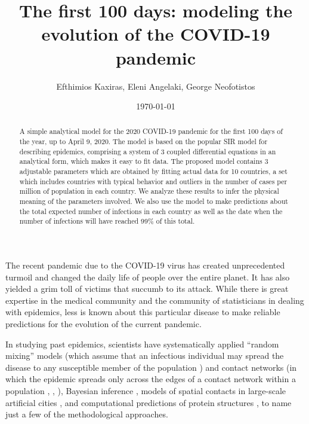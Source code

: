 \documentclass[aps,preprint]{revtex4}
\begin{document}
  

\title{The first 100 days:
modeling the evolution of the COVID-19 pandemic
}
\author{Efthimios Kaxiras, Eleni Angelaki, George Neofotistos 
}

\date{\today}


\begin{abstract}
A simple analytical model for the 2020 COVID-19 pandemic for the first 100 days of the year,
up to April 9, 2020.  The model is based on the popular SIR model for 
describing epidemics, comprising a system of 3 coupled differential equations in an analytical form, which makes it easy to fit data. 
The proposed model contains 3 adjustable parameters which are obtained by fitting actual data 
for 10 countries, a set which includes countries with typical behavior and outliers in the number 
of cases per million of population in each country.  
We analyze these results to infer the physical meaning of the parameters involved. 
We also use the model to make predictions about the total expected number of infections in each country
as well as the date when the number of infections will have reached 99\% of this total. 
\end{abstract}

\maketitle


The recent pandemic due to the COVID-19 virus has created unprecedented turmoil 
and changed the daily life of people over the entire planet.  It has also yielded 
a grim toll of victims that succumb to its attack. 
While there is great expertise in the medical community and the community of 
statisticians in dealing with epidemics, less is known about this particular disease 
to make reliable predictions for the evolution of the current pandemic. 

In studying past epidemics, scientists have systematically applied “random mixing” models (which assume that an infectious individual may spread the disease to any susceptible member of the population \cite{Kermack_1927}) and contact networks (in which the epidemic spreads only across the edges of a contact network within a population \cite{Barthelemy_2005}, \cite{Ferrari_2006}, \cite{Volz_2008}), Bayesian inference \cite{Groendyke_2011}, models of spatial contacts in large-scale artificial cities \cite{Zhang_2016}, and computational predictions of protein structures \cite{Jumper_2020}, to name just a few of the methodological approaches. 
\end{document}
